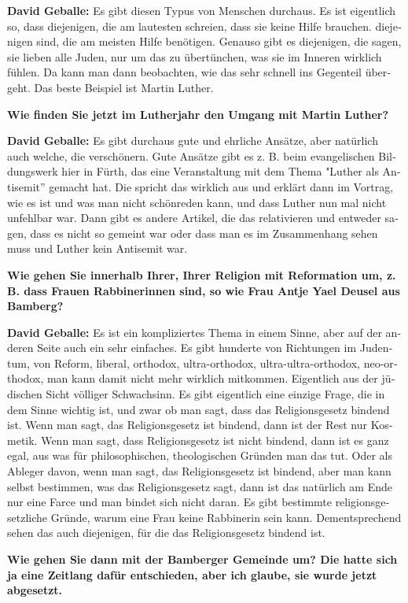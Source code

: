\begin{otherlanguage}{ngerman}
\textbf{David Geballe:} Es gibt diesen Typus von Menschen durchaus. Es ist eigentlich so, dass diejenigen, die am lautesten schreien, dass sie keine Hilfe brauchen. diejenigen sind, die am meisten Hilfe benötigen. Genauso gibt es diejenigen, die sagen, sie lieben alle Juden, nur um das zu übertünchen, was sie im Inneren wirklich fühlen. Da kann man dann beobachten, wie das sehr schnell ins Gegenteil übergeht. Das beste Beispiel ist Martin Luther. 

\textbf{Wie finden Sie jetzt im Lutherjahr den Umgang mit Martin Luther?} 

\textbf{David Geballe:} Es gibt durchaus gute und ehrliche Ansätze, aber natürlich auch welche, die verschönern. Gute Ansätze gibt es z. B. beim evangelischen Bildungswerk hier in Fürth, das eine Veranstaltung mit dem Thema "Luther als Antisemit” gemacht hat. Die spricht das wirklich aus und erklärt dann im Vortrag, wie es ist und was man nicht schönreden kann, und dass Luther nun mal nicht unfehlbar war. Dann gibt es andere Artikel, die das relativieren und entweder sagen, dass es nicht so gemeint war oder dass man es im Zusammenhang sehen muss und Luther kein Antisemit war. 

\textbf{Wie gehen Sie innerhalb Ihrer, Ihrer Religion mit Reformation um, z. B. dass Frauen Rabbinerinnen sind, so wie Frau Antje Yael Deusel aus Bamberg?} 

\textbf{David Geballe:} Es ist ein kompliziertes Thema in einem Sinne, aber auf der anderen Seite auch ein sehr einfaches. Es gibt hunderte von Richtungen im Judentum, von Reform, liberal, orthodox, ultra-orthodox, ultra-ultra-orthodox, neo-orthodox, man kann damit nicht mehr wirklich mitkommen. Eigentlich aus der jüdischen Sicht völliger Schwachsinn. Es gibt eigentlich eine einzige Frage, die in dem Sinne wichtig ist, und zwar ob man sagt, dass das Religionsgesetz bindend ist. 
Wenn man sagt, das Religionsgesetz ist bindend, dann ist der Rest nur Kosmetik. Wenn man sagt, dass Religionsgesetz ist nicht bindend, dann ist es ganz egal, aus was für philosophischen, theologischen Gründen man das tut. Oder als Ableger davon, wenn man sagt, das Religionsgesetz ist bindend, aber man kann selbst bestimmen, was das Religionsgesetz sagt, dann ist das natürlich am Ende nur eine Farce und man bindet sich nicht daran. Es gibt bestimmte religionsgesetzliche Gründe, warum eine Frau keine Rabbinerin sein kann. Dementsprechend sehen das auch diejenigen, für die das Religionsgesetz bindend ist. 

\textbf{Wie gehen Sie dann mit der Bamberger Gemeinde um? Die hatte sich ja eine Zeitlang dafür entschieden, aber ich glaube, sie wurde jetzt abgesetzt.} 


\end{otherlanguage}
